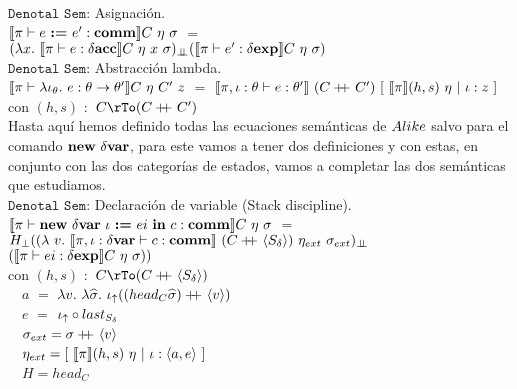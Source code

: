 \noindent
$\texttt{Denotal Sem:}$ Asignaci\'on.\\

$\llbracket  \pi \vdash e \ \textbf{:=} \ e' : \textbf{comm}  \rrbracket C \ \eta \ \sigma$ 
$=$ \\
\indent \indent \indent \indent \indent 
$(\lambda x . \ \llbracket \pi \vdash e : \delta \textbf{acc} \rrbracket C \ \eta \ x \ \sigma)_{\bot \!\!\! \bot}
(\llbracket  \pi \vdash e' : \delta \textbf{exp}  \rrbracket C \ \eta \ \sigma)$\\

\noindent
$\texttt{Denotal Sem:}$ Abstracci\'on lambda.\\

$\llbracket  \pi \vdash \lambda \iota_{\theta} . \ e : \theta \rightarrow \theta'  \rrbracket C \ \eta \ C' \ z$ 
$=$ 
$\llbracket  \pi,\iota:\theta \vdash e : \theta'  \rrbracket \ (C +\kern-1.3ex+\kern0.8ex C') \
[ \ \llbracket \pi \rrbracket(h,s) \ \eta \ | \ \iota:z \ ]$\\

con $(h,s)$ $:$ $C \rTo (C \concat C')$ \\

Hasta aqu\'i hemos definido todas las ecuaciones sem\'anticas de $Alike$ salvo
para el comando $\textbf{new} \ \delta \textbf{var}$, para este vamos a tener dos definiciones
y con estas, en conjunto con las dos categor\'ias de estados, vamos a completar 
las dos sem\'anticas que estudiamos.\\

$\texttt{Denotal Sem:}$ Declaraci\'on de variable (Stack discipline).\\

$\llbracket \pi \vdash \textbf{new} \ \delta \textbf{var} \ \iota \ \textbf{:=} \ ei \ \textbf{in} \ c : \textbf{comm} \rrbracket C \ \eta \ \sigma$ 
$=$ \\ \indent \indent
$H_{\bot} ((\lambda \ v . \ \semBrcks{\pi,\iota:\deltavar \vdash c : \commt}
		\ (C\concat\lrangles{S_\delta}) \ \eta_{ext} \ \sigma_{ext})_{\dbot}$
\\ \indent \indent  \indent  \indent  \indent \indent  \indent
\indent \indent \indent \indent \indent \indent \indent
\indent \indent \indent
$(\llbracket \pi \vdash ei : \delta \textbf{exp} \rrbracket C \ \eta \ \sigma))$\\

con $(h,s)$ $:$ $C \rTo (C \concat \lrangles{S_\delta})$ \\
\indent \indent \ \
$a$ $=$ $\lambda v. \ \lambda \widehat{\sigma} . \ \iota_{\uparrow} ((head_{C} \widehat{\sigma}) +\kern-1.3ex+\kern0.8ex \langle v \rangle)$\\
\indent \indent \ \
$e$ $=$ $ \iota_{\uparrow} \circ last_{S_\delta}$\\
\indent \indent \ \
$\sigma_{ext} = \sigma +\kern-1.3ex+\kern0.8ex \langle v \rangle $\\
\indent \indent \ \
$\eta_{ext} = [ \ \llbracket \pi \rrbracket(h,s) \ \eta \ | \ \iota:\langle a,e \rangle \ ]$\\
\indent \indent \ \
$H = head_C$\\

